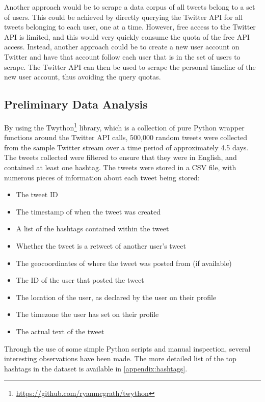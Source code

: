 \documentclass[12pt,a4paper]{article}
\begin{document}
Another approach would be to scrape a data corpus of all tweets belong to a set of users. This could be achieved by directly querying the Twitter API for all tweets belonging to each user, one at a time. However, free access to the Twitter API is limited, and this would very quickly consume the quota of the free API access. Instead, another approach could be to create a new user account on Twitter and have that account follow each user that is in the set of users to scrape. The Twitter API can then be used to scrape the personal timeline of the new user account, thus avoiding the query quotas.

\subsection{Preliminary Data Analysis}
By using the Twython\footnote{\url{https://github.com/ryanmcgrath/twython}} library, which is a collection of pure Python wrapper functions around the Twitter API calls, 500,000 random tweets were collected from the sample Twitter stream over a time period of approximately 4.5 days. The tweets collected were filtered to ensure that they were in English, and contained at least one hashtag. The tweets were stored in a CSV file, with numerous pieces of information about each tweet being stored:
\begin{itemize}
    \item The tweet ID
    \item The timestamp of when the tweet was created
    \item A list of the hashtags contained within the tweet
    \item Whether the tweet is a retweet of another user's tweet
    \item The geocoordinates of where the tweet was posted from (if available)
    \item The ID of the user that posted the tweet
    \item The location of the user, as declared by the user on their profile
    \item The timezone the user has set on their profile
    \item The actual text of the tweet
\end{itemize}

Through the use of some simple Python scripts and manual inspection, several interesting observations have been made. The more detailed list of the top hashtags in the dataset is available in \autoref{appendix:hashtags}.
\end{document}
